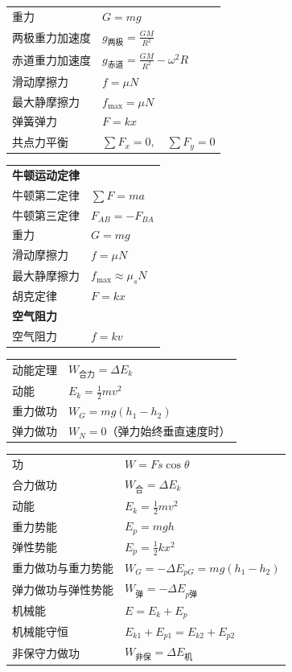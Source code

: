 \begin{tabularx}{\columnwidth}{XX}
  重力 & $G=mg$ \\
  两极重力加速度 & $g_{\text{两极}}=\frac{GM}{R^2}$ \\
  赤道重力加速度 & $g_{\text{赤道}}=\frac{GM}{R^2}-\omega^2R$ \\
  滑动摩擦力 & $f=\mu N$ \\
  最大静摩擦力 & $f_{\max}=\mu N$ \\
  弹簧弹力 & $F=kx$ \\
  共点力平衡 & $\sum F_x=0,\quad \sum F_y=0$ \\
\end{tabularx}
\medskip

\begin{tabularx}{\columnwidth}{XX}
  \multicolumn{2}{l}{\textbf{牛顿运动定律}} \\
  牛顿第二定律 & $\sum F=ma$ \\
  牛顿第三定律 & $F_{AB}=-F_{BA}$ \\
  重力 & $G=mg$ \\
  滑动摩擦力 & $f=\mu N$ \\
  最大静摩擦力 & $f_{\max}\approx \mu_s N$ \\
  胡克定律 & $F=kx$ \\
  \multicolumn{2}{l}{\textbf{空气阻力}} \\
  空气阻力 & $f=kv$ \\
\end{tabularx}
\medskip

\begin{tabularx}{\columnwidth}{XX}
  动能定理 & $W_{\text{合力}}=\Delta E_k$ \\
  动能 & $E_k=\frac12mv^2$ \\
  重力做功 & $W_G=mg(h_1-h_2)$ \\
  弹力做功 & $W_N=0$（弹力始终垂直速度时） \\
\end{tabularx}
\medskip

\begin{tabularx}{\columnwidth}{XX}
  功 & $W=Fs\cos\theta$ \\
  合力做功 & $W_{\text{合}}=\Delta E_k$ \\
  动能 & $E_k=\frac12mv^2$ \\
  重力势能 & $E_p=mgh$ \\
  弹性势能 & $E_p=\frac12kx^2$ \\
  重力做功与重力势能 & $W_G=-\Delta E_{pG}=mg(h_1-h_2)$ \\
  弹力做功与弹性势能 & $W_{\text{弹}}=-\Delta E_{p\text{弹}}$ \\
  机械能 & $E=E_k+E_p$ \\
  机械能守恒 & $E_{k1}+E_{p1}=E_{k2}+E_{p2}$ \\
  非保守力做功 & $W_{\text{非保}}=\Delta E_{\text{机}}$ \\
\end{tabularx}
\medskip

